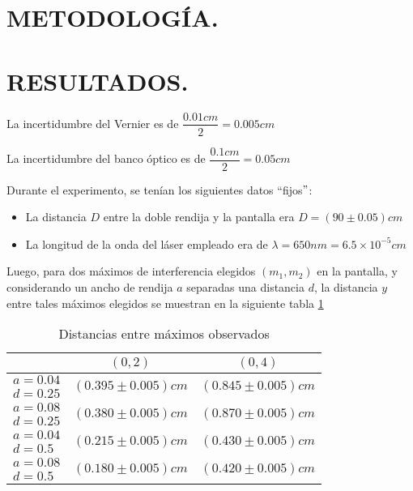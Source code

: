 \documentclass[12pt,a4paper]{article}
\begin{document}

\section{METODOLOGÍA.} %

\section{RESULTADOS.} %

  La incertidumbre del Vernier es de $ \dfrac{0.01 cm}{2}=0.005 cm $
	 
	 La incertidumbre del banco óptico es de $ \dfrac{0.1 cm}{2}=0.05 cm $
	 
	 
	 Durante el experimento, se tenían los siguientes datos ``fijos$"$:
	 
	 \begin{itemize}
	 	\item La distancia $ D $ entre la doble rendija y la pantalla era $ D=(90\pm 0.05) cm$
	 	\item La longitud de la onda del láser empleado era de $ \lambda=650 nm=6.5\times 10^{-5}cm $
	 \end{itemize}
 
 	Luego, para dos máximos de interferencia elegidos $ (m_1, m_2) $ en la pantalla, y considerando un ancho de rendija $ a $ separadas una distancia $ d $, la distancia $ y $ entre tales máximos elegidos se muestran en la siguiente tabla \ref{tab:distancias}
 	
 	\begin{table}[!htb]
 		\centering
 		\caption{Distancias entre máximos observados}
 		\begin{tabular}{|c|c|c|}
 			\hline
 			\backslashbox{$ a, d $ (mm)}{$ (m_1,m_2) $}& $ (0,2) $ & $ (0,4) $ \\
 			\hline
 			$ a=0.04 $ & \multirow{2}{*}{$ (0.395\pm 0.005) cm $} & \multirow{2}{*}{$ (0.845\pm 0.005) cm $} \\ 		
 			$ d=0.25 $ &  & \\ 
 			\hline
 			$ a=0.08 $& \multirow{2}{*}{$ (0.380\pm 0.005) cm $} & \multirow{2}{*}{$ (0.870\pm 0.005) cm $} \\
 			$ d=0.25 $&  &  \\
 			\hline
 			$ a=0.04 $          & \multirow{2}{*}{$ (0.215\pm 0.005) cm $} & \multirow{2}{*}{$ (0.430\pm 0.005) cm $} \\ 		
 			$ d=0.5\phantom{0} $&  &  \\	
 			\hline
 			$ a=0.08 $           & \multirow{2}{*}{$ (0.180 \pm 0.005) cm $} & \multirow{2}{*}{$ (0.420 \pm 0.005) cm $} \\
 			$ d=0.5\phantom{0} $ &  &  \\
 			\hline
 		\end{tabular}
 		\label{tab:distancias}
 	\end{table}
 	
\end{document}
